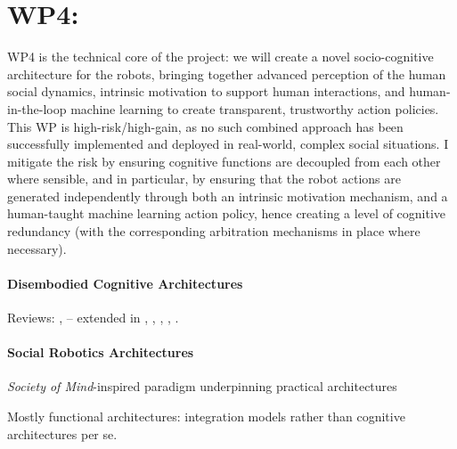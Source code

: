 \documentclass[11pt,a4paper]{report}
\begin{document}
\section{WP4: \textbf{\wpFour}}

WP4 is the technical core of the project: we will create a
novel socio-cognitive architecture for the robots, bringing together advanced
perception of the human social dynamics, intrinsic motivation to support human
interactions, and human-in-the-loop machine learning to create transparent,
trustworthy action policies. This WP is high-risk/high-gain, as no such combined
approach has been successfully implemented and deployed in real-world, complex
social situations. I mitigate the risk by ensuring cognitive functions are
decoupled from each other where sensible, and in particular, by ensuring that
the robot actions are generated independently through both an intrinsic
motivation mechanism, and a human-taught machine learning action policy, hence
creating a level of cognitive redundancy (with the corresponding arbitration
mechanisms in place where necessary).


\paragraph{Disembodied Cognitive Architectures}

Reviews: \cite{chong2007integrated}, \cite{vernon2007survey} --
extended in \cite{kingdon2008review}, \cite{duch2008cognitive},
\cite{langley2009cognitive}, \cite{taatgen2010past},
\cite{thorisson2012cognitive}.


\paragraph{Social Robotics Architectures}\label{sec:robots}


\emph{Society of Mind}-inspired paradigm underpinning practical architectures

Mostly functional architectures: integration models rather than cognitive
architectures per se.
\end{document}
